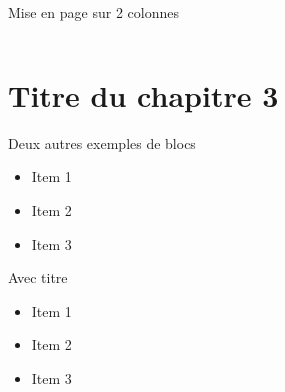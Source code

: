 \documentclass[A4,svgnames,9pt,aspectratio=169]{beamer}
\begin{document}
\begin{frame}{Mise en page sur 2 colonnes}
\begin{columns}
\begin{column}[t]{0.45\textwidth}
         \end{column}
         
  \end{columns}
\end{frame}


\section{Titre du chapitre 3}
\frame{\sectionpage}


\begin{frame}{Deux autres exemples de blocs}
    \begin{exampleblock}{}
      \begin{itemize}
        \item{Item 1 }
        \item {Item 2}
        \item {Item 3}
      \end{itemize}
    \end{exampleblock}
    \begin{exampleblock}{Avec titre}
      \begin{itemize}
        \item{Item 1 }
        \item {Item 2}
        \item {Item 3}
      \end{itemize}
    \end{exampleblock}
\end{frame}

\end{document}
